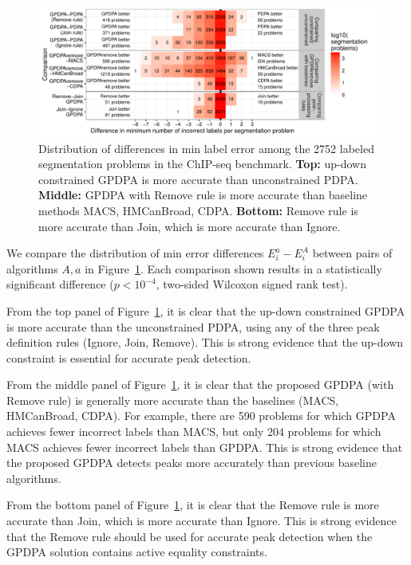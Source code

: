 \documentclass[twoside,11pt]{article}
\begin{document}
\begin{figure}
  \centering
  \includegraphics[width=\textwidth]{figure-PDPA-infeasible-error-compare}
  \vspace{-1cm}
  \caption{Distribution of differences in min label error among the
    2752 labeled segmentation problems in the ChIP-seq benchmark. 
    \textbf{Top:} up-down constrained GPDPA is more accurate than
    unconstrained PDPA. \textbf{Middle:} GPDPA with Remove
    rule is more accurate than baseline methods MACS, HMCanBroad,
    CDPA. \textbf{Bottom:} Remove rule is more accurate than 
    Join, which is more accurate than Ignore.}
  \label{fig:PDPA-infeasible-error-compare}
\end{figure} 

We compare the distribution of min error differences $E_i^a-E_i^A$
between pairs of algorithms $A,a$ in
Figure~\ref{fig:PDPA-infeasible-error-compare}. Each comparison shown
results in a
statistically significant difference ($p<10^{-4}$, two-sided Wilcoxon
signed rank test). 

From the top panel of Figure~\ref{fig:PDPA-infeasible-error-compare},
it is clear that the up-down constrained GPDPA is more accurate than
the unconstrained PDPA, using any of the three peak definition rules
(Ignore, Join, Remove). This is strong evidence that the up-down
constraint is essential for accurate peak detection.

From the middle panel of
Figure~\ref{fig:PDPA-infeasible-error-compare}, it is clear that the
proposed GPDPA (with Remove rule) is generally more accurate than the
baselines (MACS, HMCanBroad, CDPA). For example, there are 590
problems for which GPDPA achieves fewer incorrect labels than MACS,
but only 204 problems for which MACS achieves fewer incorrect labels
than GPDPA. This is strong evidence that the proposed GPDPA detects
peaks more accurately than previous baseline algorithms.

From the bottom panel of
Figure~\ref{fig:PDPA-infeasible-error-compare}, it is clear that the
Remove rule is more accurate than Join, which is more accurate than
Ignore. This is strong evidence that the Remove rule should be used
for accurate peak detection when the GPDPA solution contains active
equality constraints.
\end{document}

